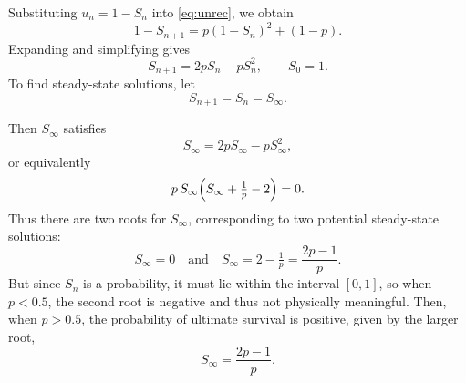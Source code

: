 Substituting $u_n = 1 - S_n$ into \eqref{eq:unrec}, we obtain
\[
1 - S_{n+1} = p (1 - S_n)^2 + (1 - p).
\]
Expanding and simplifying gives
\begin{equation}
S_{n+1}
= 2p S_n - p S_n^2,
\qquad S_0 = 1 .
\label{eq:SnIter}
\end{equation}
To find steady-state solutions, let
\[
S_{n+1} = S_n = S_\infty.
\]
\begin{figure}
    \centering
    \vspace{-10pt} %
    \vspace{35pt}
\end{figure}
Then $S_\infty$ satisfies
\[
S_\infty = 2p S_\infty - p S_\infty^2,
\]
or equivalently
\[
p\,S_\infty\Bigl(S_\infty + \tfrac1p - 2\Bigr) = 0.
\]
Thus there are two roots for $S_\infty$, corresponding to two potential steady-state solutions:
\[
S_\infty = 0
\quad\text{and}\quad
S_\infty = 2 - \tfrac1p = \dfrac{2p-1}{p}.
\]
But since $S_n$ is a probability, it must lie within the interval $[0,1]$, so when $p < 0.5$, the second root is negative and thus not physically meaningful.
Then, when $p > 0.5$, the probability of ultimate survival is positive, given by the larger root,
\[
S_\infty = \dfrac{2p-1}{p}.
\]

